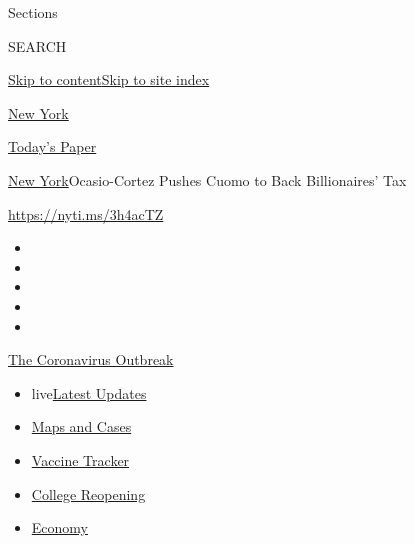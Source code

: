 Sections

SEARCH

\protect\hyperlink{site-content}{Skip to
content}\protect\hyperlink{site-index}{Skip to site index}

\href{https://www.nytimes.com/section/nyregion}{New York}

\href{https://myaccount.nytimes.com/auth/login?response_type=cookie\&client_id=vi}{}

\href{https://www.nytimes.com/section/todayspaper}{Today's Paper}

\href{/section/nyregion}{New York}\textbar{}Ocasio-Cortez Pushes Cuomo
to Back Billionaires' Tax

\url{https://nyti.ms/3h4acTZ}

\begin{itemize}
\item
\item
\item
\item
\item
\end{itemize}

\href{https://www.nytimes.com/news-event/coronavirus?action=click\&pgtype=Article\&state=default\&region=TOP_BANNER\&context=storylines_menu}{The
Coronavirus Outbreak}

\begin{itemize}
\tightlist
\item
  live\href{https://www.nytimes.com/2020/08/04/world/coronavirus-covid-19.html?action=click\&pgtype=Article\&state=default\&region=TOP_BANNER\&context=storylines_menu}{Latest
  Updates}
\item
  \href{https://www.nytimes.com/interactive/2020/us/coronavirus-us-cases.html?action=click\&pgtype=Article\&state=default\&region=TOP_BANNER\&context=storylines_menu}{Maps
  and Cases}
\item
  \href{https://www.nytimes.com/interactive/2020/science/coronavirus-vaccine-tracker.html?action=click\&pgtype=Article\&state=default\&region=TOP_BANNER\&context=storylines_menu}{Vaccine
  Tracker}
\item
  \href{https://www.nytimes.com/2020/08/02/us/covid-college-reopening.html?action=click\&pgtype=Article\&state=default\&region=TOP_BANNER\&context=storylines_menu}{College
  Reopening}
\item
  \href{https://www.nytimes.com/live/2020/08/03/business/stock-market-today-coronavirus?action=click\&pgtype=Article\&state=default\&region=TOP_BANNER\&context=storylines_menu}{Economy}
\end{itemize}


